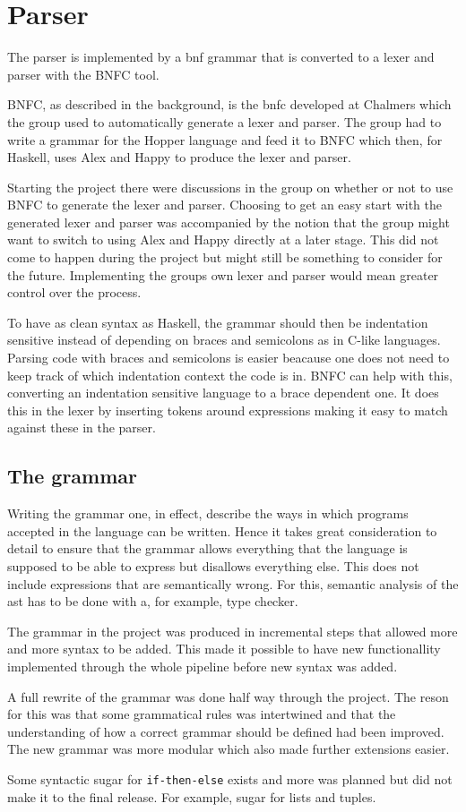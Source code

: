 \section{Parser}

The parser is implemented by a \gls{bnf} grammar that is converted to a lexer and 
parser with the BNFC tool. 

BNFC, as described in the background, is the \Gls{bnfc} developed at Chalmers which the group used to automatically generate a lexer and parser. The group had to write a grammar for the Hopper language and feed it to BNFC which then, for Haskell, uses Alex\cite{alex} and Happy\cite{happy} to produce the lexer and parser.

Starting the project there were discussions in the group on whether or not to use BNFC to generate the lexer and parser. Choosing to get an easy start with the generated lexer and parser was accompanied by the notion that the group might want to switch to using Alex and Happy directly at a later stage. This did not come to happen during the project but might still be something to consider for the future. Implementing the groups own lexer and parser would mean greater control over the process.

To have as clean syntax as Haskell, the grammar should then be indentation sensitive instead of depending on braces and semicolons as in C-like languages. Parsing code with braces and semicolons is easier beacause one does not need to keep track of which indentation context the code is in. BNFC can help with this, converting an indentation sensitive language to a brace dependent one. It does this in the lexer by inserting tokens around expressions making it easy to match against these in the parser.

\subsection{The grammar}

Writing the grammar one, in effect, describe the ways in which programs accepted in the language can be written. Hence it takes great consideration to detail to ensure that the grammar allows everything that the language is supposed to be able to express but disallows everything else. This does not include expressions that are semantically wrong. For this, semantic analysis of the \gls{ast} has to be done with a, for example, type checker. 

The grammar in the project was produced in incremental steps that allowed more and more syntax to be added. This made it possible to have new functionallity implemented through the whole pipeline before new syntax was added. 

A full rewrite of the grammar was done half way through the project. The reson for this was that some grammatical rules was intertwined and that the understanding of how a correct grammar should be defined had been improved. The new grammar was more modular which also made further extensions easier.

Some syntactic sugar for \texttt{if-then-else} exists and more was planned but did not make it to the final release. For example, sugar for lists and tuples.

